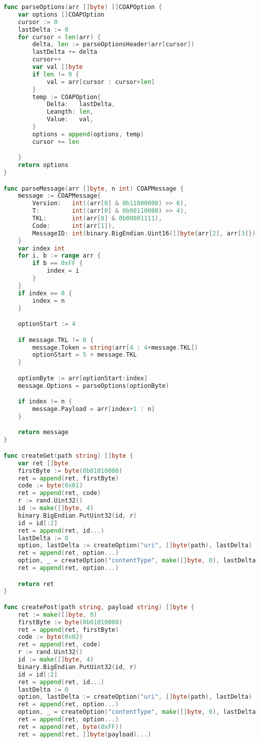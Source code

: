 \documentclass{article}
\begin{document}
\begin{appendices}
\begin{lstlisting}[language=go]
func parseOptions(arr []byte) []COAPOption {
	var options []COAPOption
	cursor := 0
	lastDelta := 0
	for cursor < len(arr) {
		delta, len := parseOptionsHeader(arr[cursor])
		lastDelta += delta
		cursor++
		var val []byte
		if len != 0 {
			val = arr[cursor : cursor+len]
		}
		temp := COAPOption{
			Delta:   lastDelta,
			Leangth: len,
			Value:   val,
		}
		options = append(options, temp)
		cursor += len

	}
	return options
}

func parseMessage(arr []byte, n int) COAPMessage {
	message := COAPMessage{
		Version:   int((arr[0] & 0b11000000) >> 6),
		T:         int((arr[0] & 0b00110000) >> 4),
		TKL:       int(arr[0] & 0b00001111),
		Code:      int(arr[1]),
		MessageID: int(binary.BigEndian.Uint16([]byte{arr[2], arr[3]})),
	}
	var index int
	for i, b := range arr {
		if b == 0xFF {
			index = i
		}
	}
	if index == 0 {
		index = n
	}

	optionStart := 4

	if message.TKL != 0 {
		message.Token = string(arr[4 : 4+message.TKL])
		optionStart = 5 + message.TKL
	}

	optionByte := arr[optionStart:index]
	message.Options = parseOptions(optionByte)

	if index != n {
		message.Payload = arr[index+1 : n]
	}

	return message
}

func createGet(path string) []byte {
	var ret []byte
	firstByte := byte(0b01010000)
	ret = append(ret, firstByte)
	code := byte(0x01)
	ret = append(ret, code)
	r := rand.Uint32()
	id := make([]byte, 4)
	binary.BigEndian.PutUint32(id, r)
	id = id[:2]
	ret = append(ret, id...)
	lastDelta := 0
	option, lastDelta := createOption("uri", []byte(path), lastDelta)
	ret = append(ret, option...)
	option, _ = createOption("contentType", make([]byte, 0), lastDelta)
	ret = append(ret, option...)

	return ret
}

func createPost(path string, payload string) []byte {
	ret := make([]byte, 0)
	firstByte := byte(0b01010000)
	ret = append(ret, firstByte)
	code := byte(0x02)
	ret = append(ret, code)
	r := rand.Uint32()
	id := make([]byte, 4)
	binary.BigEndian.PutUint32(id, r)
	id = id[:2]
	ret = append(ret, id...)
	lastDelta := 0
	option, lastDelta := createOption("uri", []byte(path), lastDelta)
	ret = append(ret, option...)
	option, _ = createOption("contentType", make([]byte, 0), lastDelta)
	ret = append(ret, option...)
	ret = append(ret, byte(0xFF))
	ret = append(ret, []byte(payload)...)


\end{lstlisting}
\end{appendices}
\end{document}
